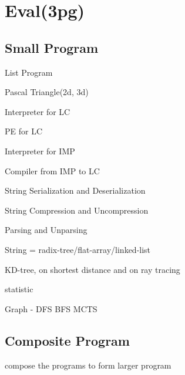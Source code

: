\section{Eval(3pg)}
\subsection{Small Program}
List Program

Pascal Triangle(2d, 3d)

Interpreter for LC

PE for LC

Interpreter for IMP

Compiler from IMP to LC

String Serialization and Deserialization

String Compression and Uncompression

Parsing and Unparsing

String = radix-tree/flat-array/linked-list

KD-tree, on shortest distance and on ray tracing

statistic 

Graph - DFS BFS MCTS

\subsection{Composite Program}
compose the programs to form larger program
